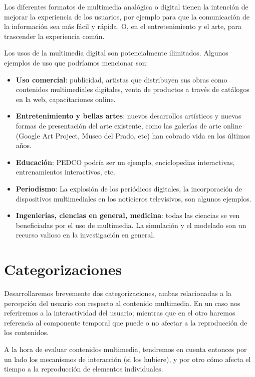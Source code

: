\documentclass[12pt]{article}
\begin{document}
Los diferentes formatos de multimedia analógica o digital tienen la 
intención de mejorar la experiencia de los usuarios, por ejemplo para 
que la comunicación de la información sea más fácil y rápida. O, en 
el entretenimiento y el arte, para trascender la experiencia común.\cite{wikipmmes} 

Los usos de la multimedia digital son potencialmente ilimitados. Algunos 
ejemplos de uso que podríamos mencionar son:  

\begin{itemize}
\item {\bf Uso comercial}: publicidad, artistas que distribuyen sus obras como contenidos 
multimediales digitales, venta de productos a través de catálogos en la web, capacitaciones online. 
\item {\bf Entretenimiento y bellas artes}: nuevos desarrollos artísticos y nuevas formas 
de presentación del arte existente, como las galerías de arte online (Google Art Project, 
Museo del Prado, etc) han cobrado vida en los últimos años.  
\item {\bf Educación}: PEDCO podría ser un ejemplo, enciclopedias interactivas, entrenamientos
interactivos, etc. 
\item {\bf Periodismo}: La explosión de los periódicos digitales, la incorporación de dispositivos 
multimediales en los noticieros televisivos, son algunos ejemplos. 
\item {\bf Ingenierías, ciencias en general, medicina}: todas las ciencias se ven 
beneficiadas por el uso de multimedia. La simulación y el modelado son un recurso 
valioso en la investigación en general. 
\end{itemize}


\section*{Categorizaciones}

Desarrollaremos brevemente dos categorizaciones, ambas relacionadas a la 
percepción del usuario con respecto al contenido multimedia. En un caso 
nos referiremos a la interactividad del usuario; mientras que en el otro 
haremos referencia al componente temporal que puede o no afectar a la
reproducción de los contenidos. 

A la hora de evaluar contenidos multimedia, tendremos en cuenta entonces
por un lado los mecanismos de interacción (si los hubiere), y por otro 
cómo afecta el tiempo a la reproducción de elementos individuales. 
\end{document}
